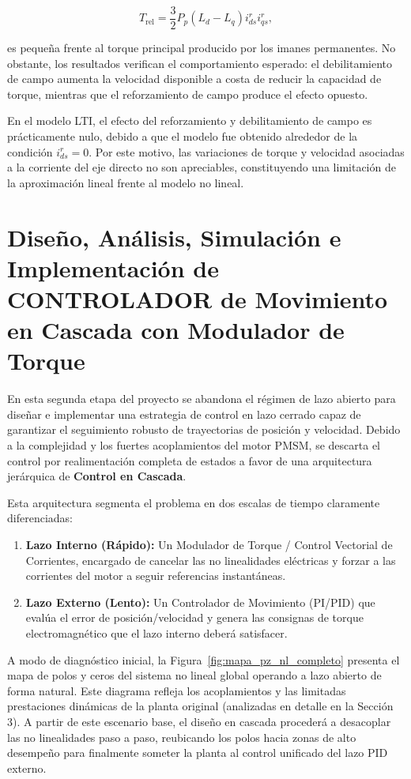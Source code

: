 \documentclass[10pt,a4paper]{article}
\begin{document}
\begin{equation}
	T_{\mathrm{rel}}
	=
	\frac{3}{2}P_p(L_d-L_q)i_{ds}^{r}i_{qs}^{r},
\end{equation}

es pequeña frente al torque principal producido por los imanes permanentes.
No obstante, los resultados verifican el comportamiento esperado: el
debilitamiento de campo aumenta la velocidad disponible a costa de reducir
la capacidad de torque, mientras que el reforzamiento de campo produce el
efecto opuesto.


En el modelo LTI, el efecto del reforzamiento y debilitamiento de campo es
prácticamente nulo, debido a que el modelo fue obtenido alrededor de la
condición $i_{ds}^{r}=0$. Por este motivo, las variaciones de torque y
velocidad asociadas a la corriente del eje directo no son apreciables,
constituyendo una limitación de la aproximación lineal frente al modelo no
lineal.



\section{Diseño, Análisis, Simulación e Implementación de CONTROLADOR de Movimiento en Cascada con Modulador de Torque}

En esta segunda etapa del proyecto se abandona el régimen de lazo abierto para diseñar e implementar una estrategia de control en lazo cerrado capaz de garantizar el seguimiento robusto de trayectorias de posición y velocidad. 
Debido a la complejidad y los fuertes acoplamientos del motor PMSM, 
se descarta el control por realimentación completa de estados a favor de una arquitectura jerárquica de \textbf{Control en Cascada}.

Esta arquitectura segmenta el problema en dos escalas de tiempo claramente diferenciadas:
\begin{enumerate}
    \item \textbf{Lazo Interno (Rápido):} Un Modulador de Torque / Control Vectorial de Corrientes, encargado de cancelar las no linealidades eléctricas y forzar a las corrientes del motor a seguir referencias instantáneas.
    \item \textbf{Lazo Externo (Lento):} Un Controlador de Movimiento (PI/PID) que evalúa el error de posición/velocidad y genera las consignas de torque electromagnético que el lazo interno deberá satisfacer.
\end{enumerate}

A modo de diagnóstico inicial, la Figura~\ref{fig:mapa_pz_nl_completo} presenta el mapa de polos y ceros del sistema no lineal global operando a lazo abierto de forma natural. Este diagrama refleja los acoplamientos y las limitadas prestaciones dinámicas de la planta original (analizadas en detalle en la Sección 3). A partir de este escenario base, el diseño en cascada procederá a desacoplar las no linealidades paso a paso, reubicando los polos hacia zonas de alto desempeño para finalmente someter la planta al control unificado del lazo PID externo.
\end{document}

